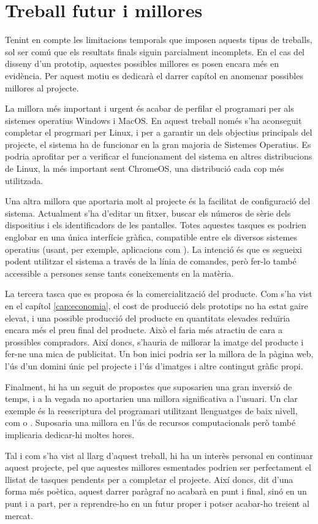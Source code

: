 \chapter{Treball futur i millores}

Tenint en compte les limitacions temporals que imposen aquests tipus de
treballs, sol ser comú que els resultats finals siguin parcialment incomplets.
En el cas del disseny d'un prototip, aquestes possibles millores es posen encara
més en evidència. Per aquest motiu es dedicarà el darrer capítol en anomenar
possibles millores al projecte.

La millora més important i urgent és acabar de perfilar el programari per als
sistemes operatius Windows i MacOS. En aquest treball només s'ha aconseguit
completar el progrmari per Linux, i per a garantir un dels objectius principals
del projecte, el sistema ha de funcionar en la gran majoria de Sistemes
Operatius. Es podria aprofitar per a verificar el funcionament del sistema en
altres distribucions de Linux, la més important sent ChromeOS, una distribució
cada cop més utilitzada.

Una altra millora que aportaria molt al projecte és la facilitat de
configuració del sistema. Actualment s'ha d'editar un fitxer, buscar els números
de sèrie dels dispositius i els identificadors de les pantalles. Totes aquestes
tasques es podrien englobar en una única interfície gràfica, compatible entre
els diversos sistemes operatius (usant, per exemple, aplicacions com
). La intenció és que es segueixi podent utilitzar el sistema a
través de la línia de comandes, però fer-lo també accessible a persones sense
tants coneixements en la matèria.

La tercera tasca que es proposa és la comercialització del producte.
Com s'ha vist en el capítol \ref{cap:economia}, el cost de producció dels
prototips no ha estat gaire elevat, i una possible producció del producte en
quantitats elevades reduïria encara més el preu final del producte. Això el
faria més atractiu de cara a prossibles compradors. Així doncs, s'hauria de
millorar la imatge del producte i fer-ne una mica de publicitat. Un bon inici
podria ser la millora de la pàgina web, l'ús d'un domini únic pel projecte
i l'ús d'imatges i altre contingut gràfic propi.

Finalment, hi ha un seguit de propostes que suposarien una gran inversió de
temps, i a la vegada no aportarien una millora significativa a l'usuari. Un clar
exemple és la reescriptura del programari utilitzant llenguatges de baix nivell,
com  o . Suposaria una millora en l'ús de recursos
computacionals però també implicaria dedicar-hi moltes hores.

Tal i com s'ha vist al llarg d'aquest treball, hi ha un interès personal en
continuar aquest projecte, pel que aquestes millores esmentades podrien ser
perfectament el llistat de tasques pendents per a completar el projecte.
Així doncs, dit d'una forma més poètica, aquest darrer paràgraf no acabarà en
punt i final, sinó en un punt i a part, per a reprendre-ho en un futur proper
i potser acabar-ho treient al mercat.
